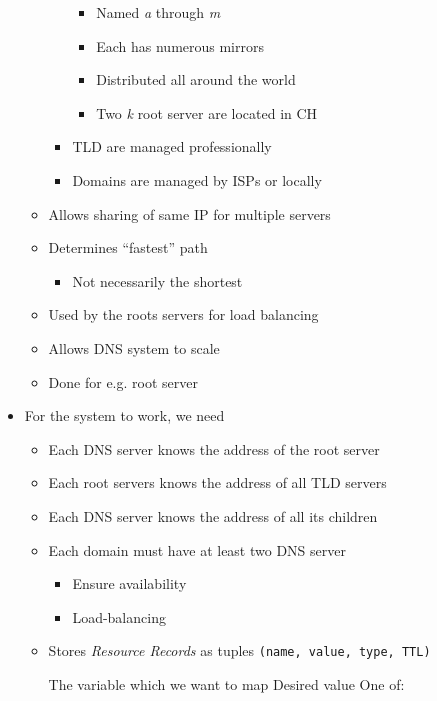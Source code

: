 \begin{itemize}
\begin{itemize}
\begin{itemize}
                        \begin{itemize}
                            \item Named \textit{a} through \textit{m}
                            \item Each has numerous mirrors
                            \item Distributed all around the world
                            \item Two \textit{k} root server are located in CH
                        \end{itemize}
                    \item TLD are managed professionally
                    \item Domains are managed by ISPs or locally
                \end{itemize}
        \end{itemize}
        \begin{itemize}
            \item Allows sharing of same IP for multiple servers
            \item Determines ``fastest'' path
                \begin{itemize}
                    \item Not necessarily the shortest
                \end{itemize}
            \item Used by the roots servers for load balancing
            \item Allows DNS system to scale
            \item Done for e.g. root server
        \end{itemize}
    \item For the system to work, we need
        \begin{itemize}
            \item Each DNS server knows the address of the root server
            \item Each root servers knows the address of all TLD servers
            \item Each DNS server knows the address of all its children
        \end{itemize}
        \begin{itemize}
            \item Each domain must have at least two DNS server
                \begin{itemize}
                    \item Ensure availability
                    \item Load-balancing
                \end{itemize}
            \item Stores \textit{Resource Records} as tuples \verb+(name, value, type, TTL)+
                \begin{itemize}
                     The variable which we want to map
                     Desired value
                     One of:


\end{itemize}
\end{itemize}
\end{itemize}
